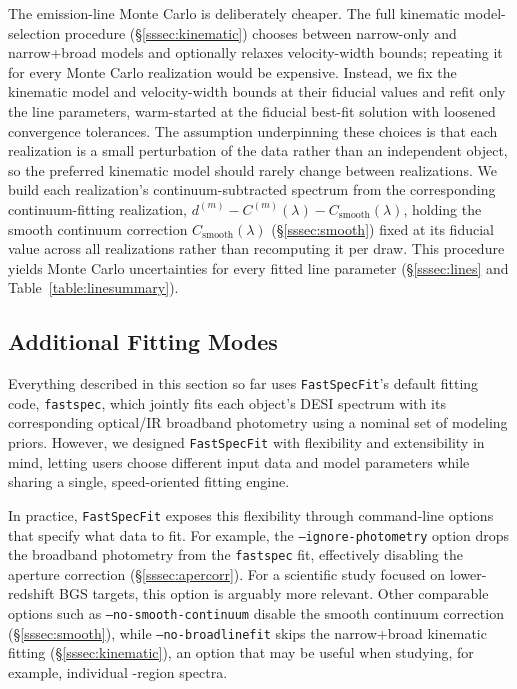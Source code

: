 \documentclass[modern,linenumbers]{aastex701}
\newcommand{\fastspecfit}{\texttt{FastSpecFit}}
\newcommand{\fastspec}{\texttt{fastspec}}
\newcommand{\hii}{\ion{H}{2}}
\begin{document}
The emission-line Monte Carlo is deliberately cheaper. The full
kinematic model-selection procedure (\S\ref{sssec:kinematic}) chooses
between narrow-only and narrow+broad models and optionally relaxes
velocity-width bounds; repeating it for every Monte Carlo realization
would be expensive. Instead, we fix the kinematic model and
velocity-width bounds at their fiducial values and refit only the line
parameters, warm-started at the fiducial best-fit solution with
loosened convergence tolerances. The assumption underpinning these
choices is that each realization is a small perturbation of the data
rather than an independent object, so the preferred kinematic model
should rarely change between realizations. We build each realization's
continuum-subtracted spectrum from the corresponding continuum-fitting
realization, $d^{(m)} - C^{(m)}(\lambda) -
C_\mathrm{smooth}(\lambda)$, holding the smooth continuum correction
$C_\mathrm{smooth}(\lambda)$ (\S\ref{sssec:smooth}) fixed at its
fiducial value across all realizations rather than recomputing it per
draw. This procedure yields Monte Carlo uncertainties for every fitted
line parameter (\S\ref{sssec:lines} and
Table~\ref{table:linesummary}).

\subsection{Additional Fitting Modes}
\label{sec:modes}

Everything described in this section so far uses \fastspecfit{}'s
default fitting code, \fastspec, which jointly fits each object's DESI
spectrum with its corresponding optical/IR broadband photometry using
a nominal set of modeling priors. However, we designed \fastspecfit{}
with flexibility and extensibility in mind, letting users choose
different input data and model parameters while sharing a single,
speed-oriented fitting engine.

In practice, \fastspecfit{} exposes this flexibility through
command-line options that specify what data to fit. For example, the
\texttt{--ignore-photometry} option drops the broadband photometry
from the \fastspec{} fit, effectively disabling the aperture
correction (\S\ref{sssec:apercorr}). For a scientific study focused on
lower-redshift BGS targets, this option is arguably more relevant.
Other comparable options such as \texttt{--no-smooth-continuum}
disable the smooth continuum correction (\S\ref{sssec:smooth}), while
\texttt{--no-broadlinefit} skips the narrow+broad kinematic fitting
(\S\ref{sssec:kinematic}), an option that may be useful when studying,
for example, individual \hii-region spectra.
\end{document}
